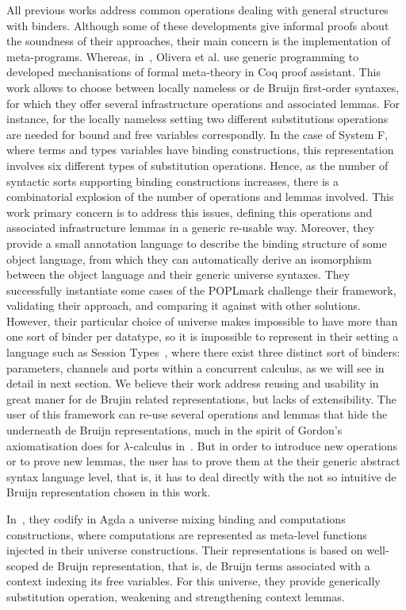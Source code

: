 \documentclass{book}
\begin{document}
All previous works address common operations dealing with general structures with binders. Although some of these developments give informal proofs about the soundness of their approaches, their main concern is the implementation of meta-programs. Whereas, in~\cite{Lee2012}, Olivera et al.  use generic programming to developed mechanisations of formal meta-theory in Coq proof assistant. This work allows to choose between locally nameless or de Bruijn first-order syntaxes, for which they offer several infrastructure operations and associated lemmas. For instance, for the locally nameless setting two different substitutions operations are needed for bound and free variables correspondly. In the case of System F, where terms and types variables have binding constructions, this representation involves six different types of substitution operations. Hence, as the number of syntactic sorts supporting binding constructions increases, there is a combinatorial explosion of the number of operations and lemmas involved. This work primary concern is to address this issues, defining this operations and associated infrastructure lemmas in a generic re-usable way. Moreover, they provide a small annotation language to describe the binding structure of some object language, from which they can automatically derive an isomorphism between the object language and their generic universe syntaxes. They successfully instantiate some cases of the POPLmark challenge their framework, validating their approach, and comparing it against with other solutions. However, their particular choice of universe makes impossible to have more than one sort of binder per datatype, so it is impossible to represent in their setting a language such as Session Types~\cite{YOSHIDA200773}, where there exist three distinct sort of binders: parameters, channels and ports within a concurrent calculus, as we will see in detail in next section. We believe their work address reusing and usability in great maner for de Brujin related representations, but lacks of extensibility. The user of this framework can re-use several operations and lemmas that hide the underneath de Bruijn representations, much in the spirit of Gordon's axiomatisation does for $\lambda$-calculus in~\cite{gordon:mechanisation:1993}. But in order to introduce new operations or to prove new lemmas, the user has to prove them at the their generic abstract syntax language level, that is, it has to deal directly with the not so intuitive de Bruijn representation chosen in this work.

In~\cite{licata-harper-09}, they codify in Agda a universe mixing binding and computations constructions, where computations are represented as meta-level functions injected in their universe constructions. Their representations is based on well-scoped de Bruijn representation, that is, de Bruijn terms associated with a context indexing its free variables. For this universe, they  provide generically substitution operation, weakening and strengthening context lemmas.
\end{document}
